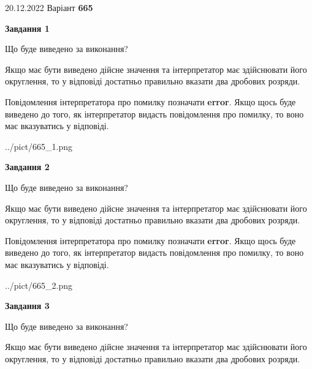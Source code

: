 \documentclass[12pt, ukrainian]{article}
\begin{document}
{20.12.2022 Варіант \No \textbf { 665 }\par}
{
\begin {Large}

{\begin {center}\textbf{Завдання 1}\end {center}}\par
Що буде виведено за виконання? \par

Якщо має бути виведено дійсне значення та інтерпретатор має здійснювати його округлення, 
то у відповіді достатньо правильно вказати два дробових розряди.

Повідомлення інтерпретатора про помилку позначати \textbf{error}.
Якщо щось буде виведено до того, як інтерпретатор видасть повідомлення про помилку, 
то воно має вказуватись у відповіді. \par

\begin{center}
	{../pict/665_1.png}
\end{center}
\newpage

{\begin {center}\textbf{Завдання 2}\end {center}}\par
Що буде виведено за виконання? \par

Якщо має бути виведено дійсне значення та інтерпретатор має здійснювати його округлення, 
то у відповіді достатньо правильно вказати два дробових розряди.

Повідомлення інтерпретатора про помилку позначати \textbf{error}.
Якщо щось буде виведено до того, як інтерпретатор видасть повідомлення про помилку, 
то воно має вказуватись у відповіді. \par

\begin{center}
	{../pict/665_2.png}
\end{center}
\newpage

{\begin {center}\textbf{Завдання 3}\end {center}}\par
Що буде виведено за виконання? \par

Якщо має бути виведено дійсне значення та інтерпретатор має здійснювати його округлення, 
то у відповіді достатньо правильно вказати два дробових розряди.


\end{Large}}
\end{document}
